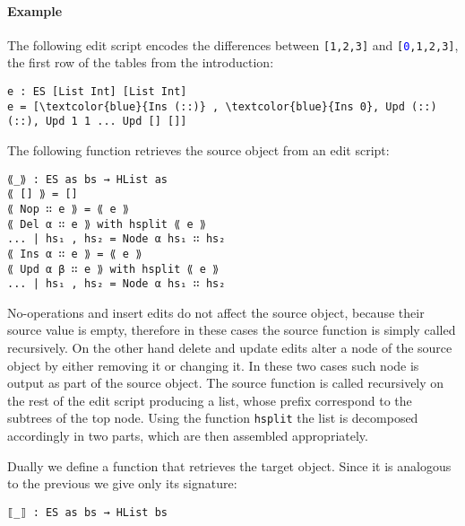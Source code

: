 \documentclass[preprint]{sigplanconf}
\begin{document}
        \paragraph{Example}
        The following edit script encodes the differences between \texttt{[1,2,3]} 
        and \texttt{[\textcolor{blue}{0},1,2,3]}, the first row of the tables 
        from the introduction:

\begin{Verbatim}[commandchars=\\\{\}]
e : ES [List Int] [List Int]
e = [\textcolor{blue}{Ins (::)} , \textcolor{blue}{Ins 0}, Upd (::) (::), Upd 1 1 ... Upd [] []]
\end{Verbatim}

	The following function retrieves the source object from an edit 
        script:			
\begin{verbatim}
⟪_⟫ : ES as bs → HList as
⟪ [] ⟫ = []
⟪ Nop ∷ e ⟫ = ⟪ e ⟫
⟪ Del α ∷ e ⟫ with hsplit ⟪ e ⟫
... | hs₁ , hs₂ = Node α hs₁ ∷ hs₂
⟪ Ins α ∷ e ⟫ = ⟪ e ⟫
⟪ Upd α β ∷ e ⟫ with hsplit ⟪ e ⟫
... | hs₁ , hs₂ = Node α hs₁ ∷ hs₂
\end{verbatim}
	No-operations and insert edits do not affect the source object,
	because their source value is empty, therefore in these cases the source 
	function is simply called recursively.
	On the other hand delete and update edits alter a node of the
	source object by either removing it or changing it.
	In these two cases such node is output as part of the source object.
	The source function is called recursively on the rest of the edit 
	script producing a list, whose prefix correspond to the subtrees of the
	top node. Using the function \texttt{hsplit} the list is decomposed 
	accordingly in two parts, which are then assembled appropriately.
	
	Dually we define a function that retrieves the target object.
	Since it is analogous to the previous we give only its signature:
	
\begin{verbatim}
⟦_⟧ : ES as bs → HList bs
\end{verbatim}
\end{document}
